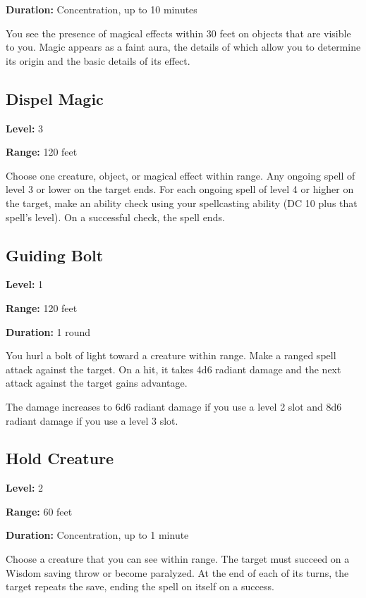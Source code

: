 \documentclass[12pt,letterpaper,twocolumn,openany,nodeprecatedcode,bg=none]{dndbook}
\let\oldsubsection\subsection
\renewcommand{\subsection}[1]{%
  \needspace{5\baselineskip}%
  \oldsubsection{#1}%
}
\begin{document}
\textbf{Duration:} Concentration, up to 10 minutes

You see the presence of magical effects within 30 feet on objects that
are visible to you. Magic appears as a faint aura, the details of which
allow you to determine its origin and the basic details of its effect.

\subsection{Dispel Magic}\label{dispel-magic}

\textbf{Level:} 3

\textbf{Range:} 120 feet

Choose one creature, object, or magical effect within range. Any ongoing
spell of level 3 or lower on the target ends. For each ongoing spell of
level 4 or higher on the target, make an ability check using your
spellcasting ability (DC 10 plus that spell's level). On a successful
check, the spell ends.

\subsection{Guiding Bolt}\label{guiding-bolt}

\textbf{Level:} 1

\textbf{Range:} 120 feet

\textbf{Duration:} 1 round

You hurl a bolt of light toward a creature within range. Make a ranged
spell attack against the target. On a hit, it takes 4d6 radiant damage
and the next attack against the target gains advantage.

The damage increases to 6d6 radiant damage if you use a level 2 slot and
8d6 radiant damage if you use a level 3 slot.

\newpage

\subsection{Hold Creature}\label{hold-creature}

\textbf{Level:} 2

\textbf{Range:} 60 feet

\textbf{Duration:} Concentration, up to 1 minute

Choose a creature that you can see within range. The target must succeed
on a Wisdom saving throw or become paralyzed. At the end of each of its
turns, the target repeats the save, ending the spell on itself on a
success.
\end{document}
